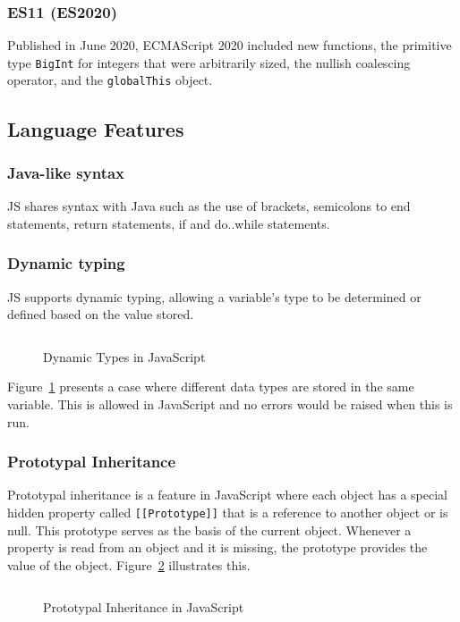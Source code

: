 \documentclass{article}
\newcommand{\js}[1]{\inputminted{javascript}{samples/js/#1.js}}
\newcommand{\jsin}[1]{\texttt{#1}}
\begin{document}
    \subsubsection{ES11 (ES2020)}
    Published in June 2020, ECMAScript 2020 included new functions, the
    primitive type \jsin{BigInt} for integers that were arbitrarily sized, the
    nullish coalescing operator, and the \jsin{globalThis} object.

    \subsection{Language Features}

    \subsubsection{Java-like syntax}
    JS shares syntax with Java such as the use of brackets, semicolons to end
    statements, return statements, if and do..while statements.

    \subsubsection{Dynamic typing}
    JS supports dynamic typing, allowing a variable’s type to be determined or
    defined based on the value stored.

    \begin{figure}[ht]
      \js{dynamic-typing}
      \caption{Dynamic Types in JavaScript}
      \label{fig:dynamic-typing}
    \end{figure}

    Figure~\ref{fig:dynamic-typing} presents a case where different data types
    are stored in the same variable. This is allowed in JavaScript and no errors
    would be raised when this is run.

    \subsubsection{Prototypal Inheritance}
    Prototypal inheritance is a feature in JavaScript where each object has a
    special hidden property called \jsin{[[Prototype]]} that is a reference to
    another object or is null. This prototype serves as the basis of the current
    object. Whenever a property is read from an object and it is missing, the
    prototype provides the value of the object. Figure~\ref{fig:prototype}
    illustrates this.

    \begin{figure}[ht]
      \js{prototype}
      \caption{Prototypal Inheritance in JavaScript}
      \label{fig:prototype}
    \end{figure}
\end{document}
